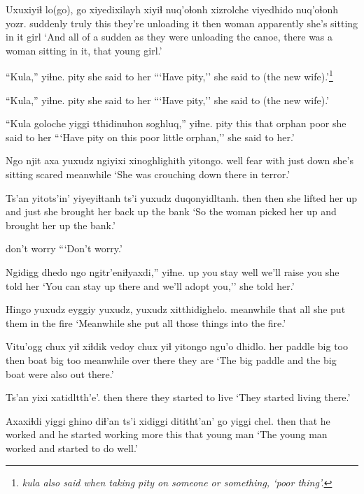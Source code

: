 \documentclass[12pt]{article}
\begin{document}
\gll Uxuxiyiɬ lo(go), go xiyedixilayh xiyiɬ nuq'oɬonh xizrolche viyedhido {nuq'oɬonh yozr.}
suddenly truly this {they're unloading it} then woman apparently {she's sitting in it} girl
\glt `And all of a sudden as they were unloading the canoe, there was a woman sitting in it, that young girl.'  
\glend

\gll ``Kula,'' yiɬne.
pity {she said to her}
\glt ```Have pity,'' she said to (the new wife).'\footnote{\em kula \em also said when taking pity on someone or something, `poor thing'.}
\glend

\gll ``Kula,'' yiɬne.
pity {she said to her}
\glt ```Have pity,'' she said to (the new wife).'
\glend

\gll ``Kula goloche yiggi tthidinuhon soghluq,'' yiɬne. 
pity this that orphan poor {she said to her}
\glt ```Have pity on this poor little orphan,'' she said to her.' 
\glend

\gll Ngo njit axa yuxudz ngiyixi xinoghlighith yitongo. 
well fear with just down {she's sitting scared} meanwhile
\glt `She was crouching down there in terror.' 
\glend

\gll Ts'an yitots'in' yiyeyiɬtanh ts'i yuxudz duqonyidltanh.
then then {she lifted her up} and  just {she brought her back up the bank}
\glt `So the woman picked her up and brought her up the bank.' 
\glend

{{don't worry}}
\glt ```Don't worry.' 
\glend

\gll Ngidigg dhedo ngo ngitr'eniɬyaxdi,'' yiɬne.
up  {you stay} well {we'll raise you} {she told her}
\glt `You can stay up there and we'll adopt you,'' she told her.'
\glend

\gll Hingo yuxudz eyggiy yuxudz, yuxudz xitthidighelo.
meanwhile {} that all {} {she put them in the fire}
\glt `Meanwhile she put all those things into the fire.' 
\glend

\gll Vitu'ogg chux yiɬ xiɬdik vedoy chux yiɬ yitongo ngu'o dhidlo. 
{her paddle} big too then boat big too meanwhile {over there} {they are}
\glt `The big paddle and the big boat were also out there.'
\glend

\gll Ts'an yixi xatidltth'e'.
then there {they started to live}
\glt `They started living there.' 
\glend

\gll Axaxiɬdi yiggi {ghino diɬ'an} ts'i {xidiggi dititht'an'} go yiggi chel.
then that {he worked} and {he started working more} this that {young man}
\glt `The young man worked and started to do well.' 
\glend
\end{document}
